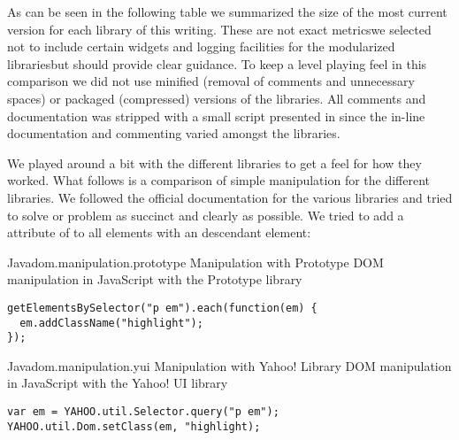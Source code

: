 As can be seen in the following table we summarized the size of the most
current version for each library of this writing. These are not exact
metrics\dash{}we selected not to include certain widgets and logging
facilities for the modularized libraries\dash{}but should provide clear
guidance. To keep a level playing feel in this comparison we did not use
minified (removal of comments and unnecessary spaces) or packaged (compressed)
versions of the libraries. All comments and documentation was stripped with a
small script presented in 
since the in-line documentation and commenting varied amongst the libraries.


We played around a bit with the different libraries to get a feel for how
they worked. What follows is a comparison of simple  manipulation
for the different libraries. We followed the official documentation for the
various libraries and tried to solve or problem as succinct and clearly as
possible. We tried to add a  attribute of  to
all  elements with an descendant  element: 

\begin{scode}{Java}{dom.manipulation.prototype}{%
   Manipulation with Prototype}{%
  DOM manipulation in JavaScript with the Prototype library}
\begin{lstlisting}
getElementsBySelector("p em").each(function(em) {
  em.addClassName("highlight");
});
\end{lstlisting}
\end{scode}

\begin{scode}{Java}{dom.manipulation.yui}{%
   Manipulation with Yahoo!  Library}{%
  DOM manipulation in JavaScript with the Yahoo! UI library}
\begin{lstlisting}
var em = YAHOO.util.Selector.query("p em"); 
YAHOO.util.Dom.setClass(em, "highlight);
\end{lstlisting}
\end{scode}

